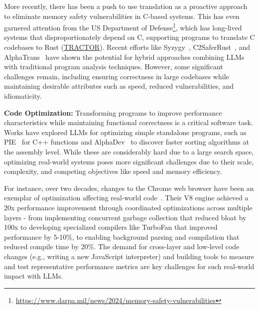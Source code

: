 More recently, there has been a push to use translation as a proactive approach to eliminate memory safety vulnerabilities in C-based systems. This has even garnered attention from the US Department of Defense\footnote{\url{https://www.darpa.mil/news/2024/memory-safety-vulnerabilities}}, which has long-lived systems that disproportionately depend on C, supporting programs to translate C codebases to Rust (\href{https://www.darpa.mil/research/programs/translating-all-c-to-rust}{TRACTOR}). 
% 
Recent efforts like Syzygy~\citep{shetty2024syzygy}, C2SaferRust~\citep{nitin2025c2saferrust}, and AlphaTrans~\citep{alphatrans} have shown the potential for hybrid approaches combining LLMs with traditional program analysis techniques. However, some significant challenges remain, including ensuring correctness in large codebases while maintaining desirable attributes such as speed, reduced vulnerabilities, and idiomaticity.
% 
% 


\textbf{Code Optimization:} Transforming programs to improve performance characteristics while maintaining functional correctness is a critical software task. Works have explored LLMs for optimizing simple standalone programs, such as PIE~\citep{pie} for C++ functions and AlphaDev~\citep{alphadev} to discover faster sorting algorithms at the assembly level. While these are considerably hard due to a large search space, optimizing real-world systems poses more significant challenges due to their scale, complexity, and competing objectives like speed and memory efficiency.
% 

For instance, over two decades, changes to the Chrome web browser have been an exemplar of optimization affecting real-world code~\citep{chromium10years}. Their V8 engine achieved a 20x performance improvement through coordinated optimizations across multiple layers - from implementing concurrent garbage collection that reduced bloat by 100x to developing specialized compilers like TurboFan that improved performance by 5-10\%, to enabling background parsing and compilation that reduced compile time by 20\%. The demand for cross-layer and low-level code changes (e.g., writing a new JavaScript interpreter) and building tools to measure and test representative performance metrics are key challenges for such real-world impact with LLMs.

